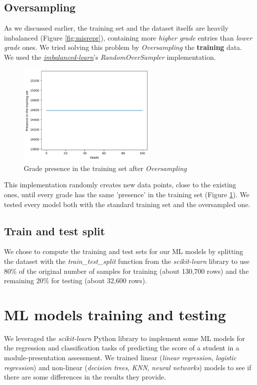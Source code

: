 \documentclass{article}
\begin{document}
\subsection{Oversampling}
\label{subsec:oversamp}
As we discussed earlier, the training set and the dataset itselfs are heavily imbalanced (Figure \ref{fig:misrepr}), containing more \textit{higher grade} entries than \textit{lower grade} ones.
We tried solving this problem by \textit{Oversampling} the \textbf{training} data.
We used the \textit{\href{https://imbalanced-learn.org/stable/references/generated/imblearn.over_sampling.RandomOverSampler.html}{imbalanced-learn}}'s \textit{RandomOverSampler} implementation.
\begin{figure}[ht]
    \centering
    \includegraphics[width=0.6\textwidth]{dataset-presence-over.png}
    \caption{Grade presence in the training set after \textit{Oversampling}}
    \label{fig:dataset-presence-over}
\end{figure}
\newpage
This implementation randomly creates new data points, close to the existing ones, until every grade has the same 'presence' in the training set (Figure \ref{fig:dataset-presence-over}).
We tested every model both with the standard training set and the oversampled one.


\subsection{Train and test split}

We chose to compute the training and test sets for our ML models by splitting the dataset with the \textit{train\_test\_split} function from the \textit{scikit-learn} library to use 80\% of the original number of samples for training (about 130,700 rows) and the remaining 20\% for testing (about 32,600 rows).

\section{ML models training and testing}
We leveraged the \textit{scikit-learn} Python library to implement some ML models for the regression and classification tasks of predicting the score of a student in a module-presentation assessment. We trained linear (\textit{linear regression}, \textit{logistic regression}) and non-linear (\textit{decision trees}, \textit{KNN}, \textit{neural networks}) models to see if there are some differences in the results they provide.\\
\end{document}
